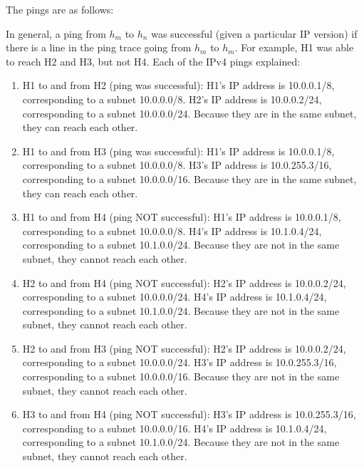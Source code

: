 The pings are as follows:

In general, a ping from $h_{m}$ to $h_{n}$ was successful (given a particular IP version) if there is a line in the ping trace going from $h_{m}$ to $h_{m}$. For example, H1 was able to reach H2 and H3, but not H4. Each of the IPv4 pings explained:
\begin{enumerate}
    \item H1 to and from H2 (ping was successful): H1's IP address is 10.0.0.1/8, corresponding to a subnet 10.0.0.0/8. H2's IP address is 10.0.0.2/24, corresponding to a subnet 10.0.0.0/24. Because they are in the same subnet, they can reach each other.
    \item H1 to and from H3 (ping was successful): H1's IP address is 10.0.0.1/8, corresponding to a subnet 10.0.0.0/8. H3's IP address is 10.0.255.3/16, corresponding to a subnet 10.0.0.0/16. Because they are in the same subnet, they can reach each other.
    \item H1 to and from H4 (ping NOT successful): H1's IP address is 10.0.0.1/8, corresponding to a subnet 10.0.0.0/8. H4's IP address is 10.1.0.4/24, corresponding to a subnet 10.1.0.0/24. Because they are not in the same subnet, they cannot reach each other.
    \item H2 to and from H4 (ping NOT successful): H2's IP address is 10.0.0.2/24, corresponding to a subnet 10.0.0.0/24. H4's IP address is 10.1.0.4/24, corresponding to a subnet 10.1.0.0/24. Because they are not in the same subnet, they cannot reach each other.
    \item H2 to and from H3 (ping NOT successful): H2's IP address is 10.0.0.2/24, corresponding to a subnet 10.0.0.0/24. H3's IP address is 10.0.255.3/16, corresponding to a subnet 10.0.0.0/16. Because they are not in the same subnet, they cannot reach each other.
    \item H3 to and from H4 (ping NOT successful): H3's IP address is 10.0.255.3/16, corresponding to a subnet 10.0.0.0/16. H4's IP address is 10.1.0.4/24, corresponding to a subnet 10.1.0.0/24. Because they are not in the same subnet, they cannot reach each other.
\end{enumerate}
